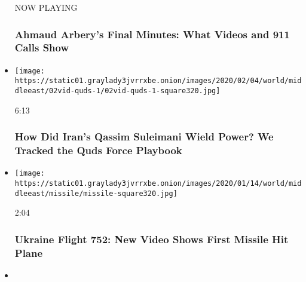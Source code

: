 \begin{itemize}
  NOW PLAYING

  \hypertarget{ahmaud-arberys-final-minutes-what-videos-and-911-calls-show-2}{%
  \subsubsection{Ahmaud Arbery's Final Minutes: What Videos and 911
  Calls
  Show}\label{ahmaud-arberys-final-minutes-what-videos-and-911-calls-show-2}}
\item
  \href{https://www.nytimes3xbfgragh.onion/video/world/middleeast/100000006906161/suleimani-quds-iran.html?action=click\&module=video-series-bar\&region=header\&pgtype=Article\&playlistId=video/investigations}{}

  \texttt{[image: https://static01.graylady3jvrrxbe.onion/images/2020/02/04/world/middleeast/02vid-quds-1/02vid-quds-1-square320.jpg]}

  6:13

  \hypertarget{how-did-irans-qassim-suleimani-wield-power-we-tracked-the-quds-force-playbook}{%
  \subsubsection{How Did Iran's Qassim Suleimani Wield Power? We Tracked
  the Quds Force
  Playbook}\label{how-did-irans-qassim-suleimani-wield-power-we-tracked-the-quds-force-playbook}}
\item
  \href{https://www.nytimes3xbfgragh.onion/video/world/middleeast/100000006920114/iran-plane-missile-video.html?action=click\&module=video-series-bar\&region=header\&pgtype=Article\&playlistId=video/investigations}{}

  \texttt{[image: https://static01.graylady3jvrrxbe.onion/images/2020/01/14/world/middleeast/missile/missile-square320.jpg]}

  2:04

  \hypertarget{ukraine-flight-752-new-video-shows-first-missile-hit-plane}{%
  \subsubsection{Ukraine Flight 752: New Video Shows First Missile Hit
  Plane}\label{ukraine-flight-752-new-video-shows-first-missile-hit-plane}}
\item
  \href{https://www.nytimes3xbfgragh.onion/video/world/middleeast/100000006911696/iran-crash.html?action=click\&module=video-series-bar\&region=header\&pgtype=Article\&playlistId=video/investigations}{}


\end{itemize}
